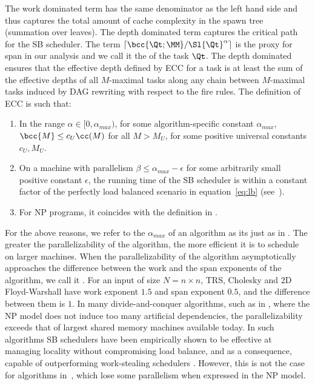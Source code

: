 The work dominated term has the same denominator as the left hand side
and thus captures the total amount of cache complexity in the spawn
tree (summation over leaves).  The depth dominated term captures the
critical path for the SB scheduler.  The term
$\lceil{\bcc{\Qt;\MM}}/{\Sl{\Qt}^\alpha}\rceil$ is the proxy for span
in our analysis and we call it the  of the task
$\Qt$. The depth dominated ensures that the effective depth defined by
ECC for a task is at least the sum of the effective depths of all
$M$-maximal tasks along any chain between $M$-maximal tasks induced
by DAG rewriting with respect to the fire rules.
The definition of ECC is such that:
\begin{enumerate}
\item
 In the range $\alpha\in [0,\alpha_{max})$, for some
algorithm-specific constant $\alpha_{max}$, $\bcc{M} \leq c_U \cc(M)$
for all $M>M_U$, for some positive universal constants $c_U, M_U$.
\item
 On a machine with parallelism $\beta \leq \alpha_{max}-\epsilon$ for
some arbitrarily small positive constant $\epsilon$, the running time
of the SB scheduler is within a constant factor of the perfectly load
balanced scenario in equation~\ref{eq:lb} (see~).
\item For NP programs, it coincides with the definition in \cite{BlellochFiGi11}.
\end{enumerate}

For the above reasons, we refer to the $\alpha_{max}$ of an algorithm
as its  just as in \cite{Simhadri13}.  The
greater the parallelizability of the algorithm, the more efficient it
is to schedule on larger machines. When the parallelizability of the
algorithm asymptotically approaches the difference between the work
and the span exponents of the algorithm, we call it .  For an input of size $N = n\times n$, TRS, Cholesky and 2D
Floyd-Warshall have work exponent $1.5$ and span exponent $0.5$, and
the difference between them is $1$. In many divide-and-conquer
algorithms, such as in \cite{BlellochGiSi10}, where the NP model does
not induce too many artificial dependencies, the parallelizability
exceeds that of largest shared memory machines available today. In
such algorithms SB schedulers have been empirically shown to be
effective at managing locality without compromising load balance, and
as a consequence, capable of outperforming work-stealing
schedulers \cite{SimhadriBlFi14}. However, this is not the case for
algorithms in~, which lose some parallelism when expressed
in the NP model.

